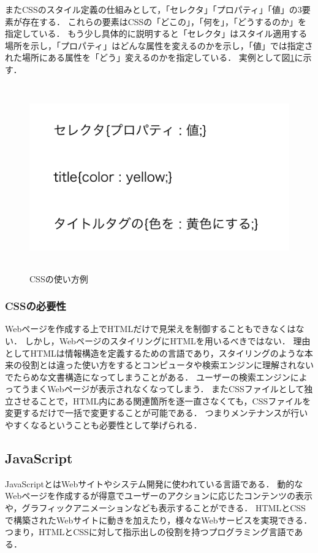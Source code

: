 \documentclass[12pt,a4j]{ltjsarticle}
\begin{document}
またCSSのスタイル定義の仕組みとして，「セレクタ」「プロパティ」「値」の3要素が存在する．
これらの要素はCSSの「どこの」，「何を」，「どうするのか」を指定している．
もう少し具体的に説明すると「セレクタ」はスタイル適用する場所を示し，「プロパティ」はどんな属性を変えるのかを示し，「値」では指定された場所にある属性を「どう」変えるのかを指定している．
実例として図\ref{fig:CSS_ex}に示す．

\begin{figure}[h]
\begin{center}
\includegraphics[height = 80mm ] {figures/css_ele.pdf}
\caption{CSSの使い方例}
\label{fig:CSS_ex}
\end{center}
\end{figure}

\clearpage

\subsubsection{CSSの必要性}
Webページを作成する上でHTMLだけで見栄えを制御することもできなくはない．
しかし，WebページのスタイリングにHTMLを用いるべきではない．
理由としてHTMLは情報構造を定義するための言語であり，スタイリングのような本来の役割とは違った使い方をするとコンピュータや検索エンジンに理解されないでたらめな文書構造になってしまうことがある．
ユーザーの検索エンジンによってうまくWebページが表示されなくなってしまう．
またCSSファイルとして独立させることで，HTML内にある関連箇所を逐一直さなくても，CSSファイルを変更するだけで一括で変更することが可能である．
つまりメンテナンスが行いやすくなるということも必要性として挙げられる\cite{css2}．

\clearpage

\subsection{JavaScript}
JavaScriptとはWebサイトやシステム開発に使われている言語である\cite{js}．
動的なWebページを作成するが得意でユーザーのアクションに応じたコンテンツの表示や，グラフィックアニメーションなども表示することができる．
HTMLとCSSで構築されたWebサイトに動きを加えたり，様々なWebサービスを実現できる．
つまり，HTMLとCSSに対して指示出しの役割を持つプログラミング言語である．
\end{document}
